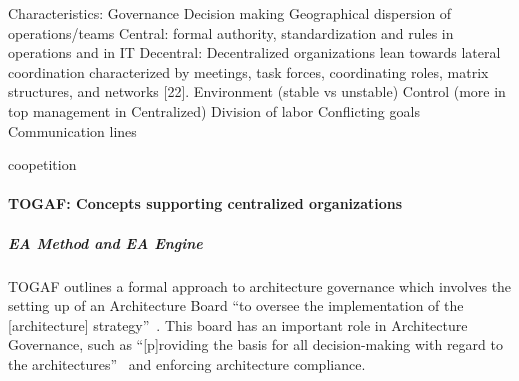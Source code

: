 Characteristics:
Governance
Decision making
Geographical dispersion of operations/teams
Central: formal authority, standardization and rules in operations and in IT
Decentral:  Decentralized organizations lean towards lateral coordination characterized by meetings, task forces, coordinating roles, matrix structures, and networks [22].
Environment (stable vs unstable)
Control (more in top management in Centralized)
Division of labor
Conflicting goals
Communication lines


coopetition








\paragraph*{TOGAF: Concepts supporting centralized organizations}

\subparagraph*{EA Method and EA Engine}
TOGAF outlines a formal approach to architecture governance which involves the setting up of an Architecture Board ``to oversee the implementation of the [architecture] strategy''~\cite[Ch. 47]{togaf9.1}. This board has an important role in Architecture Governance, such as ``[p]roviding the basis for all decision-making with regard to the architectures''~\cite[Ch. 47]{togaf9.1} and enforcing architecture compliance. 

